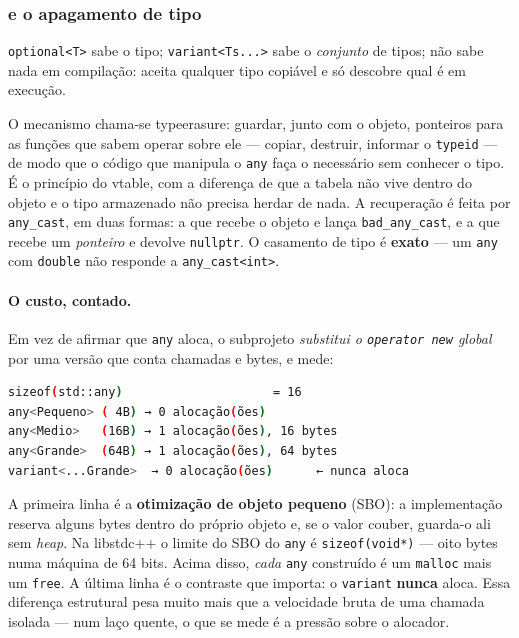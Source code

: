 \subsubsection{ e o apagamento de tipo}

\texttt{optional<T>} sabe o tipo; \texttt{variant<Ts...>} sabe o \emph{conjunto}
de tipos;  não sabe nada em compilação: aceita qualquer tipo
copiável e só descobre qual é em execução.

O mecanismo chama-se \gls{typeerasure}: guardar, junto com o objeto, ponteiros
para as funções que sabem operar sobre ele --- copiar, destruir, informar o
\texttt{typeid} --- de modo que o código que manipula o \texttt{any} faça o
necessário sem conhecer o tipo. É o princípio do \gls{vtable}, com a diferença
de que a tabela não vive dentro do objeto e o tipo armazenado não precisa herdar
de nada. A recuperação é feita por \texttt{any\_cast}, em duas formas: a que
recebe o objeto e lança \texttt{bad\_any\_cast}, e a que recebe um
\emph{ponteiro} e devolve \texttt{nullptr}. O casamento de tipo é
\textbf{exato} --- um \texttt{any} com \texttt{double} não responde a
\texttt{any\_cast<int>}.

\paragraph{O custo, contado.} Em vez de afirmar que \texttt{any} aloca, o
subprojeto \emph{substitui o \texttt{operator new} global} por uma versão que
conta chamadas e bytes, e mede:

\begin{lstlisting}[style=bt, language=bash,
    caption={Saída de \texttt{src/vocabulary\_types/}: alocações contadas ao
             construir um objeto.}]
sizeof(std::any)                     = 16
any<Pequeno> ( 4B) → 0 alocação(ões)
any<Medio>   (16B) → 1 alocação(ões), 16 bytes
any<Grande>  (64B) → 1 alocação(ões), 64 bytes
variant<...Grande>  → 0 alocação(ões)      ← nunca aloca
\end{lstlisting}

A primeira linha é a \textbf{otimização de objeto pequeno} (SBO): a
implementação reserva alguns bytes dentro do próprio objeto e, se o valor
couber, guarda-o ali sem \emph{heap}. Na libstdc++ o limite do SBO do
\texttt{any} é \texttt{sizeof(void*)} --- oito bytes numa máquina de 64 bits.
Acima disso, \emph{cada} \texttt{any} construído é um \texttt{malloc} mais um
\texttt{free}. A última linha é o contraste que importa: o \texttt{variant}
\textbf{nunca} aloca. Essa diferença estrutural pesa muito mais que a velocidade
bruta de uma chamada isolada --- num laço quente, o que se mede é a pressão
sobre o alocador.

